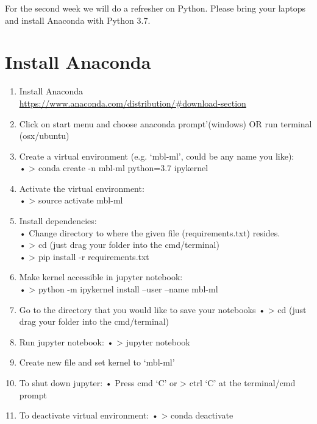 \documentclass[]{book}
\providecommand{\tightlist}{%
  \setlength{\itemsep}{0pt}\setlength{\parskip}{0pt}}
\begin{document}
For the second week we will do a refresher on Python. Please bring your
laptops and install Anaconda with Python 3.7.

\section{Install Anaconda}\label{install-anaconda}

\begin{enumerate}
\def\labelenumi{\arabic{enumi}.}
\tightlist
\item
  Install Anaconda\\
  \url{https://www.anaconda.com/distribution/\#download-section}
\item
  Click on start menu and choose anaconda prompt'(windows) OR run
  terminal (osx/ubuntu)
\item
  Create a virtual environment (e.g. `mbl-ml', could be any name you
  like):\\
  • \textgreater{} conda create -n mbl-ml python=3.7 ipykernel
\item
  Activate the virtual environment:\\
  • \textgreater{} source activate mbl-ml
\item
  Install dependencies:\\
  • Change directory to where the given file (requirements.txt)
  resides.\\
  • \textgreater{} cd (just drag your folder into the cmd/terminal)\\
  • \textgreater{} pip install -r requirements.txt\\
\item
  Make kernel accessible in jupyter notebook:\\
  • \textgreater{} python -m ipykernel install --user --name mbl-ml\\
\item
  Go to the directory that you would like to save your notebooks •
  \textgreater{} cd (just drag your folder into the cmd/terminal)
\item
  Run jupyter notebook: • \textgreater{} jupyter notebook
\item
  Create new file and set kernel to `mbl-ml'
\item
  To shut down jupyter: • Press cmd `C' or \textgreater{} ctrl `C' at
  the terminal/cmd prompt
\item
  To deactivate virtual environment: • \textgreater{} conda deactivate
\end{enumerate}


\end{document}
